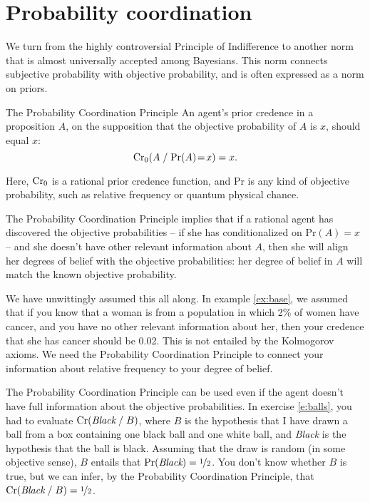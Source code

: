 \section{Probability coordination}

We turn from the highly controversial Principle of Indifference to another norm
that is almost universally accepted among Bayesians. This norm connects
subjective probability with objective probability, and is often expressed
as a norm on priors.

\begin{genericthm}{The Probability Coordination Principle}
  An agent's prior credence in a proposition $A$, on the supposition that the
  objective probability of $A$ is $x$, should equal $x$:
  \[
    \text{Cr}_0(A \;/\; \text{Pr}(A)\!=\!x) = x.
  \]
\end{genericthm}
%
\noindent%
Here, $\text{Cr}_{0}$ is a rational prior credence function, and Pr is any kind of
objective probability, such as relative frequency or quantum physical chance.

The Probability Coordination Principle implies that if a rational agent has
discovered the objective probabilities -- if she has conditionalized on
$\text{Pr}(A)\!=\!x$ -- and she doesn't have other relevant information about
$A$, then she will align her degrees of belief with the objective probabilities:
her degree of belief in $A$ will match the known objective probability.

We have unwittingly assumed this all along. In example \ref{ex:base}, we assumed
that if you know that a woman is from a population in which 2\% of women have
cancer, and you have no other relevant information about her, then your
credence that she has cancer should be 0.02. This is
not entailed by the Kolmogorov axioms. We need the Probability
Coordination Principle to connect your information about relative frequency to
your degree of belief.

The Probability Coordination Principle can be used even if the agent doesn't
have full information about the objective probabilities. In exercise
\ref{e:balls}, you had to evaluate $\text{Cr}(\emph{Black}\;/\;B)$, where $B$ is the
hypothesis that I have drawn a ball from a box containing one black ball and one
white ball, and \emph{Black} is the hypothesis that the ball is black. Assuming
that the draw is random (in some objective sense), $B$ entails that
$\text{Pr}(\emph{Black}) = \nicefrac{1}{2}$. You don't know whether $B$ is true,
but we can infer, by the Probability Coordination Principle, that
$\text{Cr}(\emph{Black} \;/\; B) = \nicefrac{1}{2}$.


